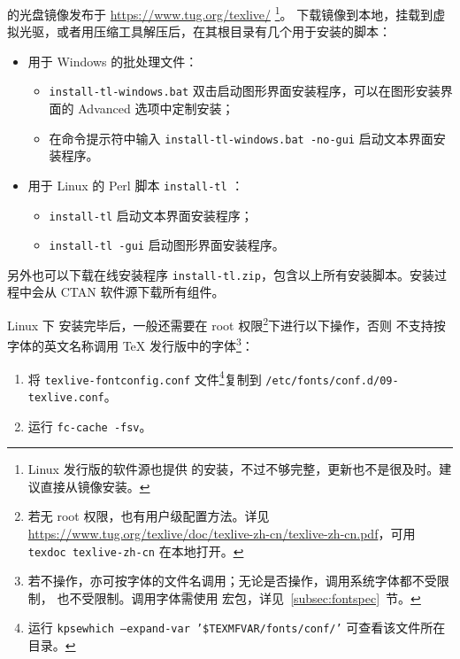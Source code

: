 \subsubsection{}

 的光盘镜像发布于 \url{https://www.tug.org/texlive/}%
\footnote{Linux 发行版的软件源也提供  的安装，不过不够完整，更新也不是很及时。建议直接从镜像安装。}。
下载镜像到本地，挂载到虚拟光驱，或者用压缩工具解压后，在其根目录有几个用于安装的脚本：
\begin{itemize}
  \item 用于 Windows 的批处理文件：
  \begin{itemize}
    \item \texttt{install-tl-windows.bat} 双击启动图形界面安装程序，可以在图形安装界面的 Advanced 选项中定制安装；
    \item 在命令提示符中输入 \texttt{install-tl-windows.bat -no-gui} 启动文本界面安装程序。
  \end{itemize}
  \item 用于 Linux 的 Perl 脚本 \texttt{install-tl} ：
  \begin{itemize}
    \item \texttt{install-tl} 启动文本界面安装程序；
    \item \texttt{install-tl -gui} 启动图形界面安装程序。
  \end{itemize}
\end{itemize}
另外也可以下载在线安装程序 \texttt{install-tl.zip}，包含以上所有安装脚本。安装过程中会从 CTAN 软件源下载所有组件。

Linux 下  安装完毕后，一般还需要在 root 权限\footnote{
  若无 root 权限，也有用户级配置方法。详见 \url{https://www.tug.org/texlive/doc/texlive-zh-cn/texlive-zh-cn.pdf}，可用 \texttt{texdoc texlive-zh-cn} 在本地打开。
}下进行以下操作，否则  不支持按字体的英文名称调用 \TeX{} 发行版中的字体\footnote{
  若不操作，亦可按字体的文件名调用；无论是否操作，调用系统字体都不受限制， 也不受限制。调用字体需使用  宏包，详见~\ref{subsec:fontspec}~节。
}：
\begin{enumerate}
  \item 将 \texttt{texlive-fontconfig.conf} 文件\footnote{运行 \texttt{kpsewhich --expand-var '\$TEXMFVAR/fonts/conf/'} 可查看该文件所在目录。}复制到 \texttt{/etc/fonts/conf.d/09-texlive.conf}。
  \item 运行 \texttt{fc-cache -fsv}。
\end{enumerate}

